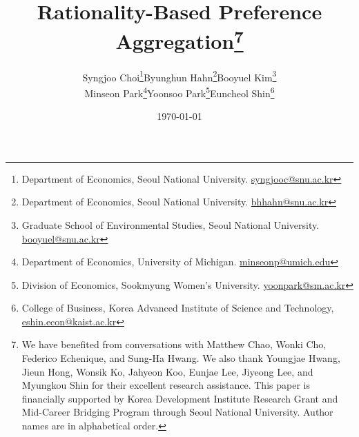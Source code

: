 \documentclass[11 pt]{article}
\begin{document}
\title{Rationality-Based Preference Aggregation\thanks{We have benefited from conversations with Matthew Chao, Wonki Cho, Federico Echenique, and Sung-Ha Hwang. We also thank Youngjae Hwang, Jieun Hong, Wonsik Ko, Jahyeon Koo, Eunjae Lee, Jiyeong Lee, and Myungkou Shin for their excellent research assistance. This paper is financially supported by Korea Development Institute Research Grant and Mid-Career Bridging Program through Seoul National University. Author names are in alphabetical order.} \\}

\author{
\begin{tabular}[t]{c@{\hskip 5em}c@{\hskip 5em}c}
 Syngjoo Choi\footnote{Department of Economics, Seoul National University. \href{mailto:syngjooc@snu.ac.kr}{syngjooc@snu.ac.kr}} &
 Byunghun Hahn\footnote{Department of Economics, Seoul National University. \href{mailto:bhhahn@snu.ac.kr}{bhhahn@snu.ac.kr}} &
 Booyuel Kim\footnote{Graduate School of Environmental Studies, Seoul National University. \href{mailto:booyuel@snu.ac.kr}{booyuel@snu.ac.kr}} \\[0.5em]
 Minseon Park\footnote{Department of Economics, University of Michigan. \href{mailto:minseonp@umich.edu}{minseonp@umich.edu}} &
 Yoonsoo Park\footnote{Division of Economics, Sookmyung Women's University. \href{mailto:yoonpark@sm.ac.kr}{yoonpark@sm.ac.kr}} &
 Euncheol Shin\footnote{College of Business, Korea Advanced Institute of Science and Technology, \href{mailto:eshin.econ@kaist.ac.kr}{eshin.econ@kaist.ac.kr}} 
\end{tabular}
}


\date{
\today
}

\maketitle

\sloppy%

\onehalfspacing
\end{document}

